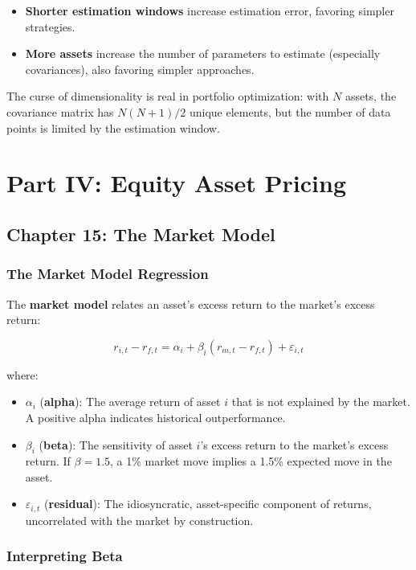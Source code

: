 \documentclass[11pt,letterpaper]{report}
\begin{document}
\begin{itemize}
  \item \textbf{Shorter estimation windows} increase estimation error, favoring simpler strategies.
  \item \textbf{More assets} increase the number of parameters to estimate (especially covariances), also favoring simpler approaches.
\end{itemize}

The curse of dimensionality is real in portfolio optimization: with $N$ assets, the covariance matrix has $N(N+1)/2$ unique elements, but the number of data points is limited by the estimation window.


\part{Part IV: Equity Asset Pricing}



\chapter{Chapter 15: The Market Model}


\section{The Market Model Regression}


The \textbf{market model} relates an asset's excess return to the market's excess return:

$$r_{i,t} - r_{f,t} = \alpha_i + \beta_i (r_{m,t} - r_{f,t}) + \varepsilon_{i,t}$$

where:

\begin{itemize}
  \item $\alpha_i$ (\textbf{alpha}): The average return of asset $i$ that is not explained by the market.  A positive alpha indicates historical outperformance.
  \item $\beta_i$ (\textbf{beta}): The sensitivity of asset $i$'s excess return to the market's excess return.  If $\beta = 1.5$, a 1\% market move implies a 1.5\% expected move in the asset.
  \item $\varepsilon_{i,t}$ (\textbf{residual}): The idiosyncratic, asset-specific component of returns, uncorrelated with the market by construction.
\end{itemize}

\section{Interpreting Beta}
\end{document}
